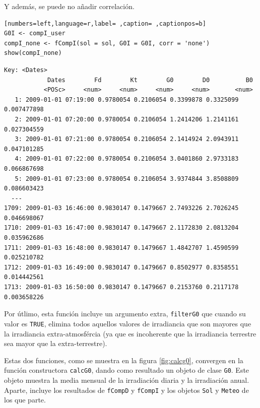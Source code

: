 \begin{itemize}
Y además, se puede no añadir correlación.
\begin{lstlisting}[numbers=left,language=r,label= ,caption= ,captionpos=b]
G0I <- compI_user
compI_none <- fCompI(sol = sol, G0I = G0I, corr = 'none')
show(compI_none)
\end{lstlisting}

\begin{verbatim}
Key: <Dates>
		    Dates        Fd        Kt        G0        D0          B0
		   <POSc>     <num>     <num>     <num>     <num>       <num>
   1: 2009-01-01 07:19:00 0.9780054 0.2106054 0.3399878 0.3325099 0.007477898
   2: 2009-01-01 07:20:00 0.9780054 0.2106054 1.2414206 1.2141161 0.027304559
   3: 2009-01-01 07:21:00 0.9780054 0.2106054 2.1414924 2.0943911 0.047101285
   4: 2009-01-01 07:22:00 0.9780054 0.2106054 3.0401860 2.9733183 0.066867698
   5: 2009-01-01 07:23:00 0.9780054 0.2106054 3.9374844 3.8508809 0.086603423
  ---                                                                        
1709: 2009-01-03 16:46:00 0.9830147 0.1479667 2.7493226 2.7026245 0.046698067
1710: 2009-01-03 16:47:00 0.9830147 0.1479667 2.1172830 2.0813204 0.035962686
1711: 2009-01-03 16:48:00 0.9830147 0.1479667 1.4842707 1.4590599 0.025210782
1712: 2009-01-03 16:49:00 0.9830147 0.1479667 0.8502977 0.8358551 0.014442561
1713: 2009-01-03 16:50:00 0.9830147 0.1479667 0.2153760 0.2117178 0.003658226
\end{verbatim}

Por útlimo, esta función incluye un argumento extra, \texttt{filterG0} que cuando su valor es \texttt{TRUE}, elimina todos aquellos valores de irradiancia que son mayores que la irradiancia extra-atmosfércia (ya que es incoherente que la irradiancia terrestre sea mayor que la extra-terrestre).
\end{itemize}

Estas dos funciones, como se muestra en la figura \ref{fig:calcg0}, convergen en la función constructora \texttt{calcG0}, dando como resultado un objeto de clase \texttt{G0}. Este objeto muestra la media mensual de la irradiación diaria y la irradiación anual. Aparte, incluye los resultados de \texttt{fCompD} y \texttt{fCompI} y los objetos \texttt{Sol} y \texttt{Meteo} de los que parte.


